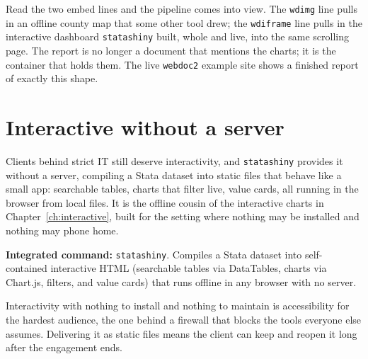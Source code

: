\documentclass[
    a4paper,
    fontsize=10pt,
    twoside=true,
    numbers=noenddot,
]{kaobook}
\begin{document}
Read the two embed lines and the pipeline comes into view. The \texttt{wdimg} line pulls in an offline county map that some other tool drew; the \texttt{wdiframe} line pulls in the interactive dashboard \texttt{statashiny} built, whole and live, into the same scrolling page. The report is no longer a document that mentions the charts; it is the container that holds them. The live \texttt{webdoc2} example site shows a finished report of exactly this shape.

\section{Interactive without a server}
Clients behind strict IT still deserve interactivity, and \texttt{statashiny} provides it without a server, compiling a Stata dataset into static files that behave like a small app: searchable tables, charts that filter live, value cards, all running in the browser from local files. It is the offline cousin of the interactive charts in Chapter~\ref{ch:interactive}, built for the setting where nothing may be installed and nothing may phone home.

\begin{kaobox}[frametitle=Package Integration: \texttt{statashiny}]
\textbf{Integrated command:} \texttt{statashiny}. Compiles a Stata dataset into self-contained interactive HTML (searchable tables via DataTables, charts via Chart.js, filters, and value cards) that runs offline in any browser with no server.
\end{kaobox}

Interactivity with nothing to install and nothing to maintain is accessibility for the hardest audience, the one behind a firewall that blocks the tools everyone else assumes. Delivering it as static files means the client can keep and reopen it long after the engagement ends.
\end{document}

